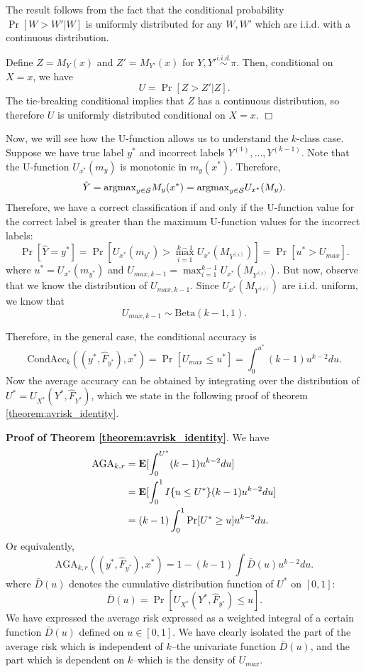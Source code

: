 \documentclass[12pt]{article}
\begin{document}
The result follows from the fact that the conditional probability
$\Pr[W > W'|W]$ is uniformly distributed for any $W, W'$ which are
i.i.d. with a continuous distribution.  

Define $Z = M_Y(x)$ and $Z' =
M_{Y'}(x)$ for $Y, Y' \stackrel{i.i.d.}{\sim} \pi$.
Then, conditional on $X = x$, we have
\[
U = \Pr[Z > Z'|Z].
\]
The tie-breaking conditional implies that $Z$ has a continuous
distribution, so therefore $U$ is uniformly distributed conditional on
$X = x$.  $\Box$

Now, we will see how the U-function allows us to understand the
$k$-class case.  Suppose we have true label $y^*$ and incorrect labels
$Y^{(1)},\hdots, Y^{(k-1)}$.  Note that the U-function
$U_{x^*}(m_y)$ is monotonic in $m_y(x^*)$.  Therefore,
\[
\hat{Y} = \text{argmax}_{y \in \mathcal{S}} M_y(x^*) = \text{argmax}_{y \in \mathcal{S}} U_{x^*}(M_y).
\]
Therefore, we have a correct classification if and only if the U-function value for the correct label
is greater than the maximum U-function values for the incorrect labels:
\[
\Pr[\hat{Y} = y^*] = \Pr[U_{x^*}(m_{y^*}) > \max_{i=1}^{k-1} U_{x^*}(M_{Y^{(i)}})] =  \Pr[u^* > U_{max}].
\]
where $u^* = U_{x^*}(m_{y^*})$ and $U_{max, k-1}
= \max_{i=1}^{k-1} U_{x^*}(M_{Y^{(i)}})$.  But now,
observe that we know the distribution of $U_{max, k-1}$.  Since
$U_{x^*}(M_{Y^{(i)}})$ are i.i.d. uniform, we know that
\begin{equation}\label{eq:umax_beta}
U_{max, k-1} \sim \text{Beta}(k-1, 1). 
\end{equation}

Therefore, in the general case, the conditional accuracy is
\[
\text{CondAcc}_k((y^*, \hat{F}_{y^*}), x^*) = \Pr[U_{max} \leq u^*] = \int_0^{u^*} (k-1) u^{k-2} du.
\]
Now the average accuracy can be obtained by integrating over the
distribution of $U^* = U_{X^*}(Y^*, \hat{F}_{Y^*})$, which we state in
the following proof of theorem \ref{theorem:avrisk_identity}.

\noindent\textbf{Proof of Theorem \ref{theorem:avrisk_identity}}.
We have
\begin{align*}
\text{AGA}_{k,r} &= \textbf{E}[\int_0^{U^*} (k-1) u^{k-2} du] 
\\&= \textbf{E}[\int_0^1 I\{u \leq U^*\} (k-1) u^{k-2} du ]
\\&= (k-1) \int_0^1 \Pr[U^* \geq u] u^{k-2} du.
\end{align*}
Or equivalently,
\[
\text{AGA}_{k, r}((y^*, \hat{F}_{y^*}), x^*) = 1 - (k-1) \int \bar{D}(u) u^{k-2} du.
\]
where $\bar{D}(u)$ denotes the cumulative distribution function of $U^*$ on $[0,1]$:
\begin{equation}\label{eq:Kbar}
\bar{D}(u) = \Pr[U_{X^*}(Y^*, \hat{F}_{y^*}) \leq u].
\end{equation}
We have expressed the average risk expressed as a weighted integral of
a certain function $\bar{D}(u)$ defined on $u \in [0,1]$.  We have
clearly isolated the part of the average risk which is independent of
$k$--the univariate function $\bar{D}(u)$, and the part which is
dependent on $k$--which is the density of $U_{max}$.
\end{document}
